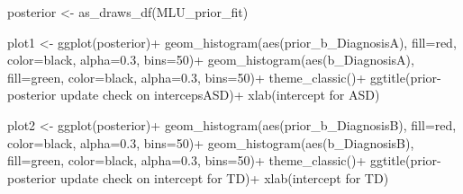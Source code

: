 \documentclass[
]{article}
\newenvironment{Shaded}{\begin{snugshade}}{\end{snugshade}}
\newcommand{\AttributeTok}[1]{\textcolor[rgb]{0.77,0.63,0.00}{#1}}
\newcommand{\DecValTok}[1]{\textcolor[rgb]{0.00,0.00,0.81}{#1}}
\newcommand{\FloatTok}[1]{\textcolor[rgb]{0.00,0.00,0.81}{#1}}
\newcommand{\FunctionTok}[1]{\textcolor[rgb]{0.00,0.00,0.00}{#1}}
\newcommand{\NormalTok}[1]{#1}
\newcommand{\OtherTok}[1]{\textcolor[rgb]{0.56,0.35,0.01}{#1}}
\newcommand{\SpecialCharTok}[1]{\textcolor[rgb]{0.00,0.00,0.00}{#1}}
\newcommand{\StringTok}[1]{\textcolor[rgb]{0.31,0.60,0.02}{#1}}
\begin{document}
\begin{Shaded}
\begin{Highlighting}[]
\NormalTok{posterior }\OtherTok{\textless{}{-}} \FunctionTok{as\_draws\_df}\NormalTok{(MLU\_prior\_fit)}

\NormalTok{plot1 }\OtherTok{\textless{}{-}} \FunctionTok{ggplot}\NormalTok{(posterior)}\SpecialCharTok{+}
  \FunctionTok{geom\_histogram}\NormalTok{(}\FunctionTok{aes}\NormalTok{(prior\_b\_DiagnosisA), }\AttributeTok{fill=}\StringTok{\textquotesingle{}red\textquotesingle{}}\NormalTok{, }\AttributeTok{color=}\StringTok{\textquotesingle{}black\textquotesingle{}}\NormalTok{, }\AttributeTok{alpha=}\FloatTok{0.3}\NormalTok{, }\AttributeTok{bins=}\DecValTok{50}\NormalTok{)}\SpecialCharTok{+}
  \FunctionTok{geom\_histogram}\NormalTok{(}\FunctionTok{aes}\NormalTok{(b\_DiagnosisA), }\AttributeTok{fill=}\StringTok{\textquotesingle{}green\textquotesingle{}}\NormalTok{, }\AttributeTok{color=}\StringTok{\textquotesingle{}black\textquotesingle{}}\NormalTok{, }\AttributeTok{alpha=}\FloatTok{0.3}\NormalTok{, }\AttributeTok{bins=}\DecValTok{50}\NormalTok{)}\SpecialCharTok{+}
  \FunctionTok{theme\_classic}\NormalTok{()}\SpecialCharTok{+}
  \FunctionTok{ggtitle}\NormalTok{(}\StringTok{\textquotesingle{}prior{-}posterior update check on intercepsASD\textquotesingle{}}\NormalTok{)}\SpecialCharTok{+}
  \FunctionTok{xlab}\NormalTok{(}\StringTok{\textquotesingle{}intercept for ASD\textquotesingle{}}\NormalTok{)}

\NormalTok{plot2 }\OtherTok{\textless{}{-}} \FunctionTok{ggplot}\NormalTok{(posterior)}\SpecialCharTok{+}
  \FunctionTok{geom\_histogram}\NormalTok{(}\FunctionTok{aes}\NormalTok{(prior\_b\_DiagnosisB), }\AttributeTok{fill=}\StringTok{\textquotesingle{}red\textquotesingle{}}\NormalTok{, }\AttributeTok{color=}\StringTok{\textquotesingle{}black\textquotesingle{}}\NormalTok{, }\AttributeTok{alpha=}\FloatTok{0.3}\NormalTok{, }\AttributeTok{bins=}\DecValTok{50}\NormalTok{)}\SpecialCharTok{+}
  \FunctionTok{geom\_histogram}\NormalTok{(}\FunctionTok{aes}\NormalTok{(b\_DiagnosisB), }\AttributeTok{fill=}\StringTok{\textquotesingle{}green\textquotesingle{}}\NormalTok{, }\AttributeTok{color=}\StringTok{\textquotesingle{}black\textquotesingle{}}\NormalTok{, }\AttributeTok{alpha=}\FloatTok{0.3}\NormalTok{, }\AttributeTok{bins=}\DecValTok{50}\NormalTok{)}\SpecialCharTok{+}
  \FunctionTok{theme\_classic}\NormalTok{()}\SpecialCharTok{+}
  \FunctionTok{ggtitle}\NormalTok{(}\StringTok{\textquotesingle{}prior{-}posterior update check on intercept for TD\textquotesingle{}}\NormalTok{)}\SpecialCharTok{+}
  \FunctionTok{xlab}\NormalTok{(}\StringTok{\textquotesingle{}intercept for TD\textquotesingle{}}\NormalTok{)}


\end{Highlighting}
\end{Shaded}
\end{document}
